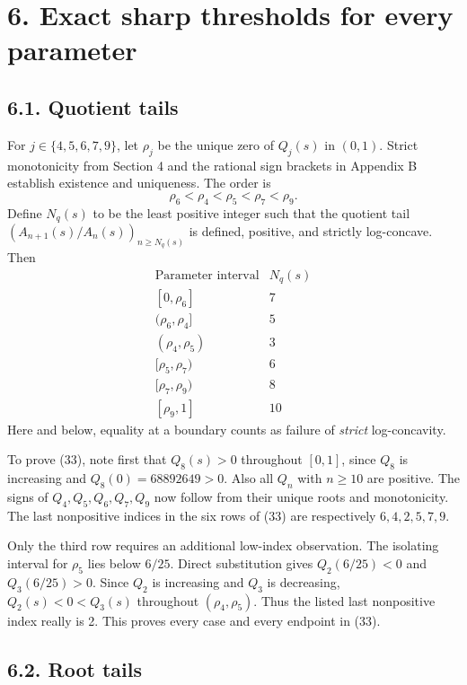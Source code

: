 \documentclass[
  11pt,
  a4paper,
]{article}
\begin{document}
\section{6. Exact sharp thresholds for every
parameter}\label{exact-sharp-thresholds-for-every-parameter}

\subsection{6.1. Quotient tails}\label{quotient-tails}

For \(j\in\{4,5,6,7,9\}\), let \(\rho_j\) be the unique zero of
\(Q_j(s)\) in \((0,1)\). Strict monotonicity from Section 4 and the
rational sign brackets in Appendix B establish existence and uniqueness.
The order is \[
\rho_6<\rho_4<\rho_5<\rho_7<\rho_9.
\tag{32}
\] Define \(N_q(s)\) to be the least positive integer such that the
quotient tail \((A_{n+1}(s)/A_n(s))_{n\ge N_q(s)}\) is defined,
positive, and strictly log-concave. Then \[
\begin{array}{c|c}
\text{Parameter interval}&N_q(s)\\\hline
{[0,\rho_6]}&7\\
(\rho_6,\rho_4]&5\\
(\rho_4,\rho_5)&3\\
{[\rho_5,\rho_7)}&6\\
{[\rho_7,\rho_9)}&8\\
{[\rho_9,1]}&10
\end{array}
\tag{33}
\] Here and below, equality at a boundary counts as failure of
\emph{strict} log-concavity.

To prove (33), note first that \(Q_8(s)>0\) throughout \([0,1]\), since
\(Q_8\) is increasing and \(Q_8(0)=68892649>0\). Also all \(Q_n\) with
\(n\ge10\) are positive. The signs of \(Q_4,Q_5,Q_6,Q_7,Q_9\) now follow
from their unique roots and monotonicity. The last nonpositive indices
in the six rows of (33) are respectively \(6,4,2,5,7,9\).

Only the third row requires an additional low-index observation. The
isolating interval for \(\rho_5\) lies below \(6/25\). Direct
substitution gives \(Q_2(6/25)<0\) and \(Q_3(6/25)>0\). Since \(Q_2\) is
increasing and \(Q_3\) is decreasing, \(Q_2(s)<0<Q_3(s)\) throughout
\((\rho_4,\rho_5)\). Thus the listed last nonpositive index really is 2.
This proves every case and every endpoint in (33).

\subsection{6.2. Root tails}\label{root-tails}
\end{document}
